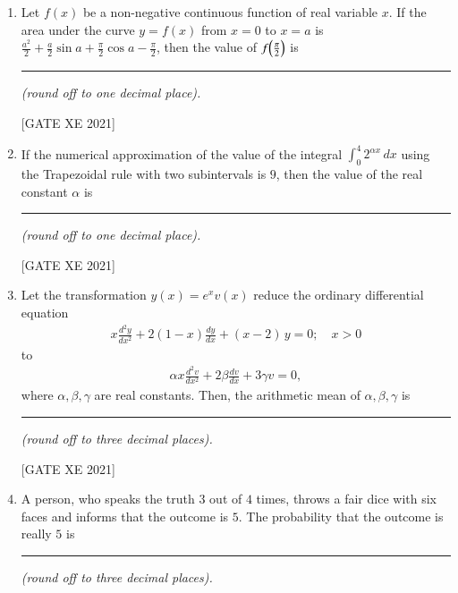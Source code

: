 \documentclass[journal,12pt,onecolumn]{IEEEtran}
\theoremstyle{remark}
\begin{document}
\begin{enumerate}
\hfill[GATE XE 2021]

\begin{multicols}{2}
\begin{enumerate}
\item \(\displaystyle \frac{3}{4}+i\,\frac{\sqrt{3}}{4}\)
\item \(\displaystyle \frac{3}{4}-i\,\frac{\sqrt{3}}{4}\)
\item \(\displaystyle -\frac{3}{4}+i\,\frac{\sqrt{3}}{4}\)
\item \(\displaystyle -\frac{3}{4}-i\,\frac{\sqrt{3}}{4}\)
\end{enumerate}
\end{multicols}


\item Let \(f(x)\) be a non-negative continuous function of real variable \(x\). If the area under the curve \(y=f(x)\) from \(x=0\) to \(x=a\) is \(\displaystyle \frac{a^{2}}{2}+\frac{a}{2}\sin a+\frac{\pi}{2}\cos a-\frac{\pi}{2}\), then the value of \(f\!\left(\frac{\pi}{2}\right)\) is \rule{2.5cm}{0.15mm} \textit{(round off to one decimal place).}

\hfill[GATE XE 2021]


\item If the numerical approximation of the value of the integral \(\displaystyle \int_{0}^{4} 2^{\alpha x}\,dx\) using the Trapezoidal rule with two subintervals is \(9\), then the value of the real constant \(\alpha\) is \rule{2.5cm}{0.15mm} \textit{(round off to one decimal place).}

\hfill[GATE XE 2021]


\item Let the transformation \(y(x)=e^{x}v(x)\) reduce the ordinary differential equation
\begin{align}
    x\frac{d^{2}y}{dx^{2}}+2(1-x)\frac{dy}{dx}+(x-2)\,y=0;\quad x>0
\end{align}
to
\begin{align}
\alpha x\frac{d^{2}v}{dx^{2}}+2\beta \frac{dv}{dx}+3\gamma v=0,
\end{align}
where \(\alpha,\beta,\gamma\) are real constants. Then, the arithmetic mean of \(\alpha,\beta,\gamma\) is \rule{2.5cm}{0.15mm} \textit{(round off to three decimal places).}

\hfill[GATE XE 2021]


\item A person, who speaks the truth \(3\) out of \(4\) times, throws a fair dice with six faces and informs that the outcome is \(5\). The probability that the outcome is really \(5\) is \rule{2.5cm}{0.15mm} \textit{(round off to three decimal places).}


\end{enumerate}
\end{document}
